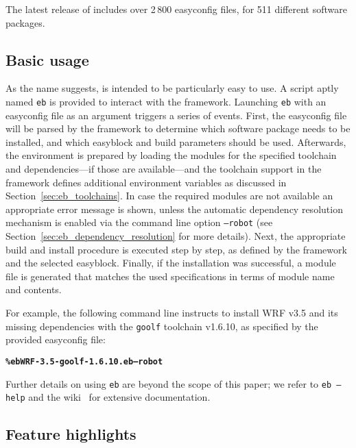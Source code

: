 The latest release of \easybuild{} includes over 2\,800 easyconfig files, for
511 different software packages. 

\subsection{Basic usage}
\label{sec:eb_basic_usage}

As the name suggests, \easybuild{} is intended to be particularly easy to use. A script aptly named
\texttt{\small eb} is provided to interact with the \easybuild{} framework.
Launching \texttt{\small eb} with an easyconfig file as an argument triggers a
series of events. First, the easyconfig file will be parsed by the \easybuild{}
framework to determine which software package needs to be installed, and which
easyblock and build parameters should be used. Afterwards, the environment is
prepared by loading the modules for the specified toolchain and dependencies---if
those are available---and the toolchain support in the framework defines additional
environment variables as discussed in Section~\ref{sec:eb_toolchains}. In case the
required modules are not available an appropriate error message is shown, unless
the automatic dependency resolution mechanism is enabled via the command line option
\texttt{\small --robot} (see Section~\ref{sec:eb_dependency_resolution} for more
details). Next,
the appropriate build and install procedure is executed step by step, as defined by
the framework and the selected easyblock. Finally, if the installation was successful, a module file is generated that
matches the used specifications in terms of module name and contents.

For example, the following command line instructs \easybuild{} to install WRF v3.5
and its missing dependencies with the \texttt{\small goolf} toolchain v1.6.10, as
specified by the provided easyconfig file:

{\small
\begin{alltt}
    \textbf{\% eb WRF-3.5-goolf-1.6.10.eb --robot}
\end{alltt}
}
\noindent
Further details on using \texttt{\small eb} are beyond the scope of this paper; we
refer to \texttt{\small eb --help} and the \easybuild{} wiki~\cite{ebwiki} for
extensive documentation.

\subsection{Feature highlights}
\label{sec:eb_features}

